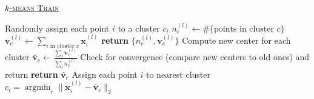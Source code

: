 \documentclass[10pt]{article}
\DeclareMathOperator*{\argmin}{argmin}
\begin{document}
\begin{algorithm}
    \caption{\underline{\textsc{$k$-means Train}}}
    \label{kmeans}
    \begin{algorithmic}[1] %
		 
			\State Randomly assign each point $i$ to a cluster $c_i$
		\EndProcedure
		\Loop
			 
						\State $n_c^{(l)} \gets \# \{\text{points in cluster }c \}$
						\State $\mathbf{v}_{c}^{(l)} \gets \sum_{i \text{ in cluster }c} \mathbf{x}_{i}^{(l)}$
				\EndFor
				\State \textbf{return } $\{ n_c^{(l)}, \mathbf{v}_{c}^{(l)} \}$
			\EndProcedure
				\State Compute new center for each cluster $\bar{\mathbf{v}}_{c} \gets \frac{\sum_l \mathbf{v}_{c}^{(l)}}{\sum_l n_c^{(l)}} $
				\State Check for convergence (compare new centers to old ones) and return
				\State \textbf{return} $\bar{\mathbf{v}}_{c}$
			\EndProcedure
			 
				\State Assign each point $i$ to nearest cluster $c_i = \argmin_c \| \mathbf{x}_{i}^{(l)} - \bar{\mathbf{v}}_{c} \|_2$
			\EndProcedure
		\EndLoop
    \end{algorithmic}
\end{algorithm}
\end{document}
